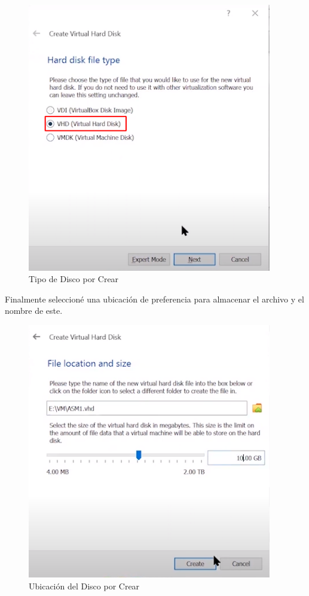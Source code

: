 \documentclass{article}
\begin{document}
\begin{figure}[H]
		\begin{center}
			\includegraphics[width=0.95\textwidth]{vm_shared_disk_creation_type.png}
		\end{center}
		\caption{Tipo de Disco por Crear}
\end{figure}

Finalmente seleccioné una ubicación de preferencia para almacenar el archivo y el nombre de este.

\begin{figure}[H]
		\begin{center}
			\includegraphics[width=0.95\textwidth]{vm_shared_disk_creation_location.png}
		\end{center}
		\caption{Ubicación del Disco por Crear}
\end{figure}
\end{document}
